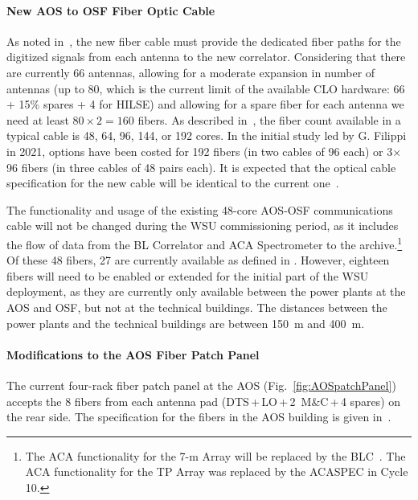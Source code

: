 \paragraph{New AOS to OSF Fiber Optic Cable}
\label{sec:newFiber}
As noted in~\cite{scwg}, the new fiber cable must provide the dedicated fiber paths for the digitized signals from each antenna to the new correlator. Considering that there are currently 66 antennas, allowing for a moderate expansion in number of antennas (up to 80, which is the current limit of the available CLO hardware: 66 + 15\% spares + 4 for HILSE) and allowing for a spare fiber for each antenna we need at least $80 \times 2=160$ fibers. As described in~\cite{optcab}, the fiber count available in a typical cable is 48, 64, 96, 144, or 192 cores.  In the initial study led by G. Filippi in 2021, options have been costed for 192 fibers (in two cables of 96 each) or 3$\times$96 fibers (in three cables of 48 pairs each). It is expected that the optical cable specification for the new cable will be identical to the current one~\cite{befo}.
 
The functionality and usage of the existing 48-core AOS-OSF communications cable will not be changed during the WSU commissioning period, as it includes the flow of data from the BL Correlator and ACA Spectrometer to the archive.\footnote{The ACA functionality for the 7-m Array will be replaced by the BLC~\cite{ACAEoL}. The ACA functionality for the TP Array was replaced by the ACASPEC in Cycle 10.} Of these 48 fibers, 27 are currently available as defined in \cite{FO_Memo}. However, eighteen fibers will need to be enabled or extended for the initial part of the WSU deployment, as they are currently only available between the power plants at the AOS and OSF, but not at the technical buildings. The distances between the power plants and the technical buildings are between 150~m and 400~m.



\paragraph{Modifications to the AOS Fiber Patch Panel}\label{AOS_patchpanel}
The current four-rack fiber patch panel at the AOS (Fig.~\ref{fig:AOSpatchPanel}) accepts the 8 fibers from each antenna pad (DTS\,+\,LO\,+\,2~M\&C\,+\,4 spares) on the rear side. The specification for the fibers in the AOS building is given in~\cite{befo}.

